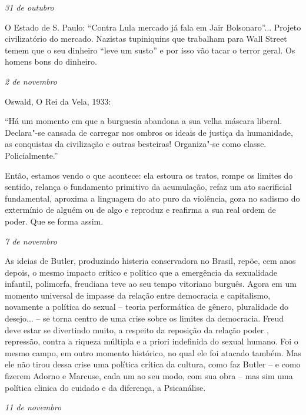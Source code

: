 \begin{flushright}
\emph{31 de outubro}
\end{flushright}

O Estado de S. Paulo: ``Contra Lula mercado já fala em Jair
Bolsonaro''... Projeto civilizatório do mercado. Nazistas tupiniquins
que trabalham para Wall Street temem que o seu dinheiro ``leve um
susto'' e por isso vão tacar o terror geral. Os homens bons do dinheiro.

\begin{flushright}
\emph{2 de novembro}
\end{flushright}

Oswald, O Rei da Vela, 1933:

``Há um momento em que a burguesia abandona a sua velha máscara liberal.
Declara"-se cansada de carregar nos ombros os ideais de justiça da
humanidade, as conquistas da civilização e outras besteiras! Organiza"-se
como classe. Policialmente.''

Então, estamos vendo o que acontece: ela estoura os tratos, rompe os
limites do sentido, relança o fundamento primitivo da acumulação, refaz
um ato sacrificial fundamental, aproxima a linguagem do ato puro da
violência, goza no sadismo do extermínio de alguém ou de algo e reproduz
e reafirma a sua real ordem de poder. Que se forma assim.

\begin{flushright}
\emph{7 de novembro}
\end{flushright}

As ideias de Butler, produzindo histeria conservadora no Brasil, repõe,
cem anos depois, o mesmo impacto crítico e político que a emergência da
sexualidade infantil, polimorfa, freudiana teve ao seu tempo vitoriano
burguês. Agora em um momento universal de impasse da relação entre
democracia e capitalismo, novamente a política do sexual -- teoria
performática de gênero, pluralidade do desejo... -- se torna centro de
uma crise sobre os limites da democracia. Freud deve estar se divertindo
muito, a respeito da reposição da relação poder , repressão, contra a
riqueza múltipla e a priori indefinida do sexual humano. Foi o mesmo
campo, em outro momento histórico, no qual ele foi atacado também. Mas
ele não tirou dessa crise uma política crítica da cultura, como faz
Butler -- e como fizerem Adorno e Marcuse, cada um ao seu modo, com sua
obra -- mas sim uma política clinica do cuidado e da diferença, a
Psicanálise.

\begin{flushright}
\emph{11 de novembro}
\end{flushright}

